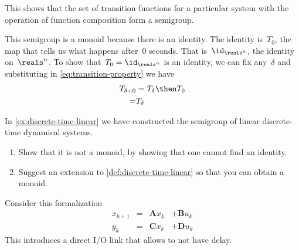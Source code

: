 \begin{example}
  This shows that the set of transition functions for a particular system with the operation of function composition form a semigroup.

  This semigroup is a monoid because there is an identity. The identity is~$T_0$, the map that tells us
  what happens after~$0$ seconds. That is~$\id_{\reals^n}$, the identity on~$\reals^n$.
  To show that~$T_0 = \id_{\reals^n}$ is an identity, we can fix any~$\delta$ and substituting in \cref{eq:transition-property} we have
  \begin{equation*}
    \begin{aligned}
      T_{\delta + 0}&= T_{\delta} \then T_{0} \\
      = & T_{\delta}
    \end{aligned}
  \end{equation*}

\end{example}


\begin{exercise}
  In \cref{ex:discrete-time-linear} we have constructed the semigroup of linear discrete-time dynamical systems.

  \begin{enumerate}
    \item Show that it is not a monoid, by showing that one cannot find an identity.
    \item Suggest an extension to \cref{def:discrete-time-linear} so that you can obtain a monoid.
  \end{enumerate}
\end{exercise}
\begin{solution}
  Consider this formalization
   \begin{equation} \label{eq:discrete-time-dynamics-D}
      \begin{aligned}
        x_{k+1} &=& \mathbf{A} x_k & + \mathbf{B} u_k \\
        y_{k}   &=& \mathbf{C} x_k & + \mathbf{D} u_k
      \end{aligned}
    \end{equation}
  This introduces a direct I/O link that allows to not have delay.


\end{solution}

